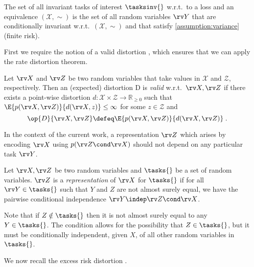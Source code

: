 \documentclass[final]{article}
\begin{document}
\begin{definition}\label{def:invariant_tasks_interest}
The set of all invariant tasks of interest $\tasksinv{}$ w.r.t.\ to a loss and an  equivalence $(\mathcal X, \sim)$ is the set of all random variables $\rv Y$ that are conditionally invariant w.r.t.\ $(\mathcal X, \sim)$ and that satisfy \cref{assumption:variance} (finite risk).
\end{definition}



First we require the notion of a valid distortion \cite{berger_rate_1968}, which ensures that we can apply the rate distortion theorem.


\begin{definition}\label{def:valid_distortion}
Let $\rv X$ and $\rv Z$ be two random variables that take values in $\mathcal{X}$ and $\mathcal{Z}$, respectively.
Then an (expected) distortion $\mathrm{D}$ is \textit{valid} w.r.t.\ $\rv X,\rv Z$ if there exists a point-wise distortion $d : \mathcal{X} \times \mathcal{Z} \to \mathbb{R}_{\geq 0}$ such that $\E{p(\rv X, \rv Z)}{d(\rv X, z)} \leq \infty$ for some $z \in \mathcal{Z}$ and 
\begin{equation}
\op{D}{\rv X, \rv Z} \defeq \E{p(\rv X, \rv Z)}{d(\rv X, \rv Z)} \;.
\end{equation}
\end{definition}

In the context of the current work, a representation $\rv Z$ which arises by encoding $\rv X$ using $p(\rv Z \cond \rv X)$ should not depend on any particular task $\rv Y$. 

\begin{definition}\label{def:representations}
Let $\rv X, \rv Z$ be two random variables and $\tasks{}$ be a set of random variables.
$\rv Z$ is a \textit{representation} of $\rv X$ for $\tasks{}$ if for all $\rv Y \in \tasks{}$ such that $Y$ and $Z$ are not almost surely equal, we have the pairwise conditional independence $\rv Y \indep \rv Z \cond \rv X$.
\end{definition}

Note that if $Z \notin \tasks{}$ then it is not almost surely equal to any $Y \in \tasks{}$. The condition allows for the possibility that $Z \in \tasks{}$, but it must be conditionally independent, given $X$, of all other random variables in $\tasks{}$. 


We now recall the excess risk distortion \disttext{}.
\end{document}
